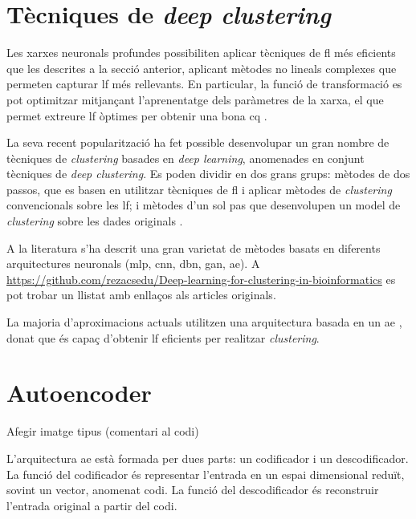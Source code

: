 \documentclass[CAT,BIB]{TFUOC}%
\newcommand{\todo}[1]{
            \begin{tcolorbox}[title=ToDo!, colback=red!5!white, colframe=red!50!black, coltext=red!50!black]
            #1
            \end{tcolorbox}}
\begin{document}
    \section{Tècniques de \textit{deep clustering}}
    \label{s:state_deep}

        Les xarxes neuronals profundes possibiliten aplicar tècniques de \gls{fl} més eficients que les descrites a la secció anterior, aplicant mètodes no lineals complexes que permeten capturar \gls{lf} més rellevants. En particular, la funció de transformació es pot optimitzar mitjançant l'aprenentatge dels paràmetres de la xarxa, el que permet extreure \gls{lf} òptimes per obtenir una bona \gls{cq} \citep{Karim2021}.

        La seva recent popularització ha fet possible desenvolupar un gran nombre de tècniques de \textit{clustering} basades en \textit{deep learning}, anomenades en conjunt tècniques de \textit{deep clustering}. Es poden dividir en dos grans grups: mètodes de dos passos, que es basen en utilitzar tècniques de \gls{fl} i aplicar mètodes de \textit{clustering} convencionals sobre les \gls{lf}; i mètodes d'un sol pas que desenvolupen un model de \textit{clustering} sobre les dades originals \citep{Karim2021}.

        A la literatura s'ha descrit una gran varietat de mètodes basats en diferents arquitectures neuronals (\gls{mlp}, \gls{cnn}, \gls{dbn}, \gls{gan}, \gls{ae}). A \url{https://github.com/rezacsedu/Deep-learning-for-clustering-in-bioinformatics} \citep{Karim2021} es pot trobar un llistat amb enllaços als articles originals.

        La majoria d'aproximacions actuals utilitzen una arquitectura basada en un \gls{ae} \citep{Karim2021}, donat que és capaç d'obtenir \gls{lf} eficients per realitzar \textit{clustering}.


    \section{Autoencoder}
    \label{s:state_ae}

\todo{Afegir imatge tipus (comentari al codi)
}

        L'arquitectura \gls{ae} està formada per dues parts: un codificador i un descodificador. La funció del codificador és representar l'entrada en un espai dimensional reduït, sovint un vector, anomenat codi. La funció del descodificador és reconstruir l'entrada original a partir del codi.
\end{document}
